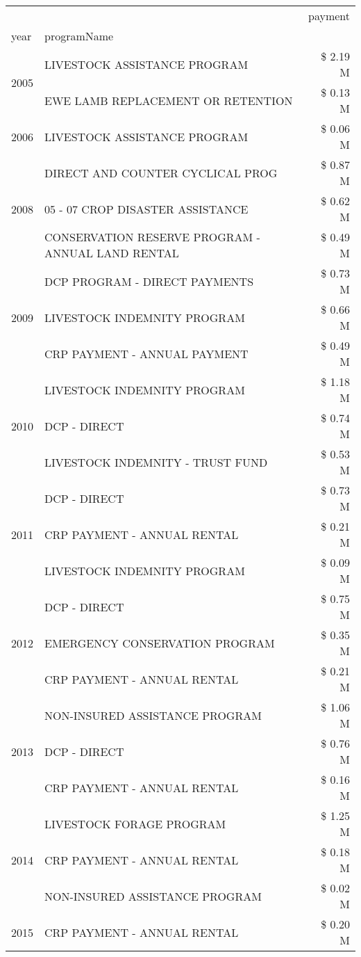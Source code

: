 \begin{tabular}{llr}
\toprule
 &  & payment \\
year & programName &  \\
\midrule
\multirow[t]{2}{*}{2005} & LIVESTOCK ASSISTANCE PROGRAM & \$ 2.19 M \\
 & EWE LAMB REPLACEMENT OR RETENTION & \$ 0.13 M \\
\cline{1-3}
2006 & LIVESTOCK ASSISTANCE PROGRAM & \$ 0.06 M \\
\cline{1-3}
\multirow[t]{3}{*}{2008} & DIRECT AND COUNTER CYCLICAL PROG & \$ 0.87 M \\
 & 05 - 07 CROP DISASTER ASSISTANCE & \$ 0.62 M \\
 & CONSERVATION RESERVE PROGRAM - ANNUAL LAND RENTAL & \$ 0.49 M \\
\cline{1-3}
\multirow[t]{3}{*}{2009} & DCP PROGRAM - DIRECT PAYMENTS & \$ 0.73 M \\
 & LIVESTOCK INDEMNITY PROGRAM & \$ 0.66 M \\
 & CRP PAYMENT - ANNUAL PAYMENT & \$ 0.49 M \\
\cline{1-3}
\multirow[t]{3}{*}{2010} & LIVESTOCK INDEMNITY PROGRAM & \$ 1.18 M \\
 & DCP - DIRECT & \$ 0.74 M \\
 & LIVESTOCK INDEMNITY - TRUST FUND & \$ 0.53 M \\
\cline{1-3}
\multirow[t]{3}{*}{2011} & DCP - DIRECT & \$ 0.73 M \\
 & CRP PAYMENT - ANNUAL RENTAL & \$ 0.21 M \\
 & LIVESTOCK INDEMNITY PROGRAM & \$ 0.09 M \\
\cline{1-3}
\multirow[t]{3}{*}{2012} & DCP - DIRECT & \$ 0.75 M \\
 & EMERGENCY CONSERVATION PROGRAM & \$ 0.35 M \\
 & CRP PAYMENT - ANNUAL RENTAL & \$ 0.21 M \\
\cline{1-3}
\multirow[t]{3}{*}{2013} & NON-INSURED ASSISTANCE PROGRAM & \$ 1.06 M \\
 & DCP - DIRECT & \$ 0.76 M \\
 & CRP PAYMENT - ANNUAL RENTAL & \$ 0.16 M \\
\cline{1-3}
\multirow[t]{3}{*}{2014} & LIVESTOCK FORAGE PROGRAM & \$ 1.25 M \\
 & CRP PAYMENT - ANNUAL RENTAL & \$ 0.18 M \\
 & NON-INSURED ASSISTANCE PROGRAM & \$ 0.02 M \\
\cline{1-3}
\multirow[t]{3}{*}{2015} & CRP PAYMENT - ANNUAL RENTAL & \$ 0.20 M \\

\end{tabular}
